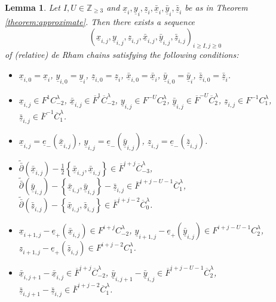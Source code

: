 \documentclass[a4paper]{article}
\newtheorem{lemma}[theorem]{Lemma}
\numberwithin{equation}{section}
\begin{document}
\begin{lemma}\label{lemma:induction}
Let $I,U\in\mathbb{Z}_{\geq3}$ and $\underline{x}_i,\underline{y}_i,\underline{z}_i,\bar{\underline{x}}_i,\bar{\underline{y}}_i,\bar{\underline{z}}_i$ be as in Theorem \ref{theorem:approximate}. Then there exists a sequence
\begin{equation}
(\underline{x}_{i,j},\underline{y}_{i,j},\underline{z}_{i,j},\bar{\underline{x}}_{i,j},\bar{\underline{y}}_{i,j},\bar{\underline{z}}_{i,j})_{i\geq I,j\geq0}
\end{equation}
of (relative) de Rham chains satisfying the following conditions:
\begin{itemize}
	\item[(i)] $\underline{x}_{i,0}=\underline{x}_i$, $\underline{y}_{i,0}=\underline{y}_i$, $\underline{z}_{i,0}=\underline{z}_i$, $\bar{\underline{x}}_{i,0}=\bar{\underline{x}}_i$,  $\bar{\underline{y}}_{i,0}=\bar{\underline{y}}_i$, $\bar{\underline{z}}_{i,0}=\bar{\underline{z}}_i$.
	\item[(ii)] $\underline{x}_{i,j}\in F^1C_{-2}^\lambda$, $\bar{\underline{x}}_{i,j}\in\overline{F}^1\overline{C}_{-2}^\lambda$, $\underline{y}_{i,j}\in F^{-U}C_2^\lambda$, $\bar{\underline{y}}_{i,j}\in \overline{F}^{-U}\overline{C}_2^\lambda$, $\underline{z}_{i,j}\in F^{-1}C_1^\lambda$, $\bar{\underline{z}}_{i,j}\in\overline{F}^{-1}\overline{C}_1^\lambda$.
	\item[(iii)] $\underline{x}_{i,j}=\underline{e}_-(\underline{\bar{x}}_{i,j})$, $\underline{y}_{i,j}=\underline{e}_-(\bar{\underline{y}}_{i,j})$, $\underline{z}_{i,j}=\underline{e}_-(\bar{\underline{z}}_{i,j})$.
	\item[(iv)] $\tilde{\bar{\partial}}(\bar{\underline{x}}_{i,j})-\frac{1}{2}\left\{\bar{\underline{x}}_{i,j},\bar{\underline{x}}_{i,j}\right\}\in\overline{F}^{i+j}\overline{C}_{-3}^\lambda$, $\tilde{\bar{\partial}}(\bar{\underline{y}}_{i,j})-\left\{\bar{\underline{x}}_{i,j},\bar{\underline{y}}_{i,j}\right\}-\bar{\underline{z}}_{i,j}\in\overline{F}^{i+j-U-1}\overline{C}_1^\lambda$, $\tilde{\bar{\partial}}(\bar{\underline{z}}_{i,j})-\left\{\bar{\underline{x}}_{i,j},\bar{\underline{z}}_{i,j}\right\}\in\overline{F}^{i+j-2}\overline{C}_0^\lambda$.
	\item[(v)] $\underline{x}_{i+1,j}-\underline{e}_+(\bar{\underline{x}}_{i,j})\in F^{i+j}C_{-2}^\lambda$, $\underline{y}_{i+1,j}-\underline{e}_+(\bar{\underline{y}}_{i,j})\in F^{i+j-U-1}C_2^\lambda$, $\underline{z}_{i+1,j}-\underline{e}_+(\bar{\underline{z}}_{i,j})\in F^{i+j-2}C_1^\lambda$.
	\item[(vi)] $\bar{\underline{x}}_{i,j+1}-\bar{\underline{x}}_{i,j}\in\overline{F}^{i+j}\overline{C}_{-2}^\lambda$, $\bar{\underline{y}}_{i,j+1}-\bar{\underline{y}}_{i,j}\in\overline{F}^{i+j-U-1}\overline{C}_2^\lambda$, $\bar{\underline{z}}_{i,j+1}-\bar{\underline{z}}_{i,j}\in\overline{F}^{i+j-2}\overline{C}_1^\lambda$.

\end{itemize}
\end{lemma}
\end{document}
